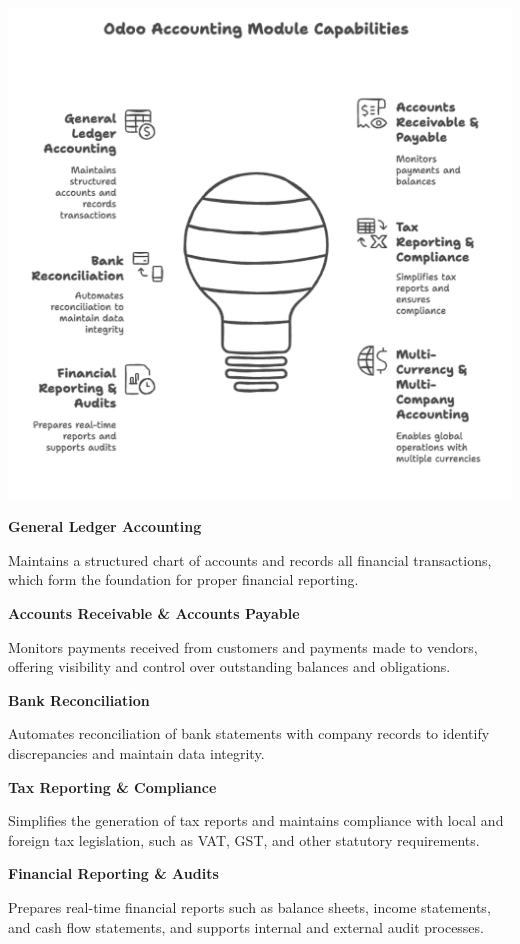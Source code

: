 \documentclass[11pt,a4paper]{article}
\begin{document}
\begin{center}
    \includegraphics[width=0.8\linewidth]{diagram/odoo_accounting_module_capabilities.png}
\end{center}

\noindent\textbf{General Ledger Accounting}

\noindent Maintains a structured chart of accounts and records all financial transactions, which form the foundation for proper financial reporting.

\noindent\textbf{Accounts Receivable \& Accounts Payable}

\noindent Monitors payments received from customers and payments made to vendors, offering visibility and control over outstanding balances and obligations.

\noindent\textbf{Bank Reconciliation}

\noindent Automates reconciliation of bank statements with company records to identify discrepancies and maintain data integrity.

\noindent\textbf{Tax Reporting \& Compliance}

\noindent Simplifies the generation of tax reports and maintains compliance with local and foreign tax legislation, such as VAT, GST, and other statutory requirements.

\noindent\textbf{Financial Reporting \& Audits}

\noindent Prepares real-time financial reports such as balance sheets, income statements, and cash flow statements, and supports internal and external audit processes.
\end{document}
